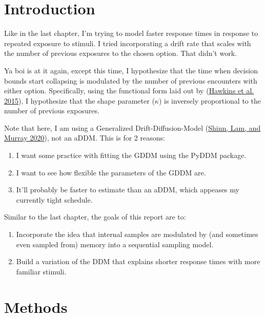 \documentclass[
]{book}
\begin{document}
\hypertarget{introduction-1}{%
\section{Introduction}\label{introduction-1}}

Like in the last chapter, I'm trying to model faster response times in response to repeated exposure to stimuli. I tried incorporating a drift rate that scales with the number of previous exposures to the chosen option. That didn't work.

Ya boi is at it again, except this time, I hypothesize that the time when decision bounds start collapsing is modulated by the number of previous encounters with either option. Specifically, using the functional form laid out by (\protect\hyperlink{ref-hawkins2015}{Hawkins et al. 2015}), I hypothesize that the shape parameter (\(\kappa\)) is inversely proportional to the number of previous exposures.

Note that here, I am using a Generalized Drift-Diffusion-Model (\protect\hyperlink{ref-shinn2020}{Shinn, Lam, and Murray 2020}), not an aDDM. This is for 2 reasons:

\begin{enumerate}
\def\labelenumi{\arabic{enumi}.}
\item
  I want some practice with fitting the GDDM using the PyDDM package.
\item
  I want to see how flexible the parameters of the GDDM are.
\item
  It'll probably be faster to estimate than an aDDM, which appeases my currently tight schedule.
\end{enumerate}

Similar to the last chapter, the goals of this report are to:

\begin{enumerate}
\def\labelenumi{\arabic{enumi}.}
\item
  Incorporate the idea that internal samples are modulated by (and sometimes even sampled from) memory into a sequential sampling model.
\item
  Build a variation of the DDM that explains shorter response times with more familiar stimuli.
\end{enumerate}

\hypertarget{methods-1}{%
\section{Methods}\label{methods-1}}
\end{document}
